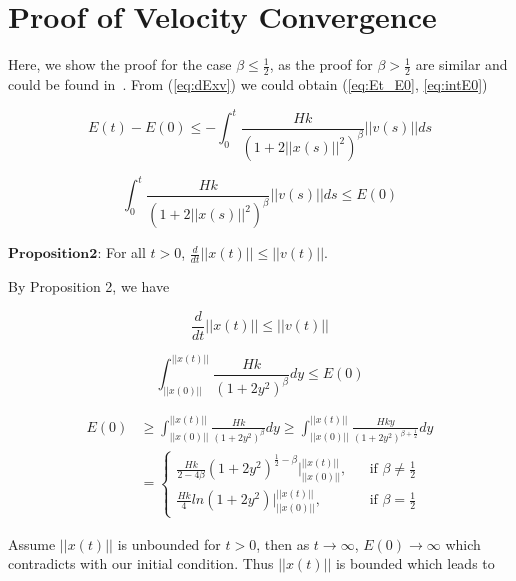 \section{Proof of Velocity Convergence}

Here, we show the proof for the case $\beta\leq\frac{1}{2}$, as the proof for $\beta>\frac{1}{2}$ are similar and could be found in~\cite{CuckerDong2010}. From (\ref{eq:dExv}) we could obtain (\ref{eq:Et_E0}, \ref{eq:intE0})

\begin{equation}\label{eq:Et_E0}
E(t)-E(0)\leq-\int_0^t\frac{Hk}{(1+2||x(s)||^2)^{\beta}}||v(s)||ds
\end{equation}

\begin{equation}\label{eq:intE0}
\int_0^t\frac{Hk}{(1+2||x(s)||^2)^{\beta}}||v(s)||ds\leq E(0)
\end{equation}

$\mathbf{Proposition 2}$: For all $t>0$, $\frac{d}{dt}||x(t)||\leq||v(t)||$.

By Proposition 2, we have

\begin{equation}\label{eq:proposition2}
\frac{d}{dt}||x(t)||\leq||v(t)||
\end{equation}

\begin{equation}
\int_{||x(0)||}^{||x(t)||}\frac{Hk}{(1+2y^2)^{\beta}}dy\leq E(0)
\end{equation}

\begin{equation}
\begin{aligned}
E(0)&\geq\int_{||x(0)||}^{||x(t)||}\frac{Hk}{(1+2y^2)^{\beta}}dy\geq\int_{||x(0)||}^{||x(t)||}\frac{Hky}{(1+2y^2)^{\beta+\frac{1}{2}}}dy\\
&=\left\{\begin{array}{rcl}\frac{Hk}{2-4\beta}(1+2y^2)^{\frac{1}{2}-\beta}|^{||x(t)||}_{||x(0)||}, & & \text{if $\beta\neq\frac{1}{2}$}\\\frac{Hk}{4}ln(1+2y^2)|^{||x(t)||}_{||x(0)||}, & & \text{if $\beta=\frac{1}{2}$}\end{array} \right.
\end{aligned}
\end{equation}

\noindent
Assume $||x(t)||$ is unbounded for $t>0$, then as $t\to\infty$, $E(0)\to\infty$ which contradicts with our initial condition. Thus $||x(t)||$ is bounded which leads to

